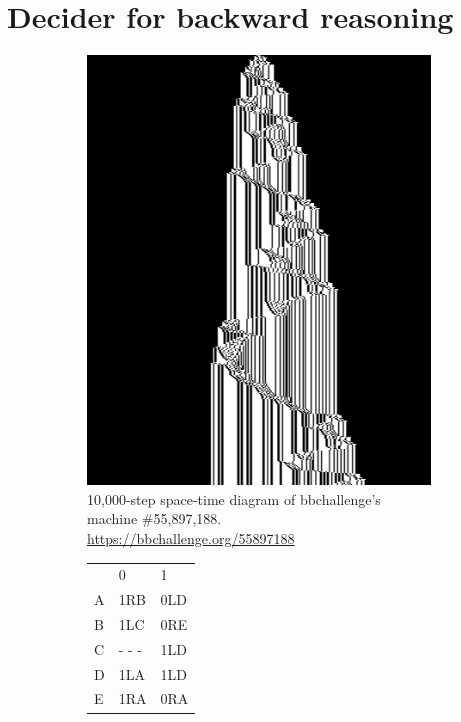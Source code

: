 \section{Decider for backward reasoning}\label{sec:backward-reasoning}

\begin{figure}
  \centering
  \begin{subfigure}[m]{0.45\textwidth}
    \centering
    \includegraphics[width=\textwidth]{space-time-diagrams/backward_reasoning_55897188.png}
    \caption{10,000-step space-time diagram of bbchallenge's machine \#55,897,188. \url{https://bbchallenge.org/55897188}}
    \label{fig:y equals x}
  \end{subfigure}
  \hfill
  \begin{subfigure}[m]{0.45\textwidth}
    \centering
    \begin{tabular}{lll}
                            & 0                       & 1   \\
      \textcolor{colorA}{A} & 1R\textcolor{colorB}{B} & 0LD \\
      \textcolor{colorB}{B} & 1L\textcolor{colorC}{C} & 0RE \\
      \textcolor{colorC}{C} & - - -                   & 1LD \\
      D                     & 1LA                     & 1LD \\
      E                     & 1RA                     & 0RA
    \end{tabular}



\end{subfigure}
\end{figure}
